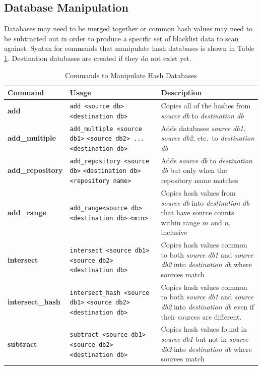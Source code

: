 \documentclass[11pt,fleqn]{article} %
\begin{document}
\subsection{Database Manipulation}
\label{DatabaseManipulation}
Databases may need to be merged together or common hash values may need to be subtracted out in order to produce a specific set of blacklist data to scan against.
Syntax for commands that manipulate hash databases is shown in Table \ref{tab:databaseManipulation}.
Destination databases are created if they do not exist yet.
\begin{table}[!ht]
\centering
\caption{Commands to Manipulate Hash Databases}
\label{tab:databaseManipulation}
\begin{tabular}{|p{3.5 cm}|p{6 cm}|p{4 cm}|}
\hline \hline
\textbf{Command} & \textbf{Usage} & \textbf{Description} \\
\hline
\textbf{add} & \verb+add <source db>+ \verb+<destination db>+ & Copies all of the hashes from \textit{source db} to \textit{destination db}\\
\hline
\textbf{add\_multiple} &  \verb+add_multiple <source db1>+ \verb+<source db2> ...+ \verb+<destination db>+ & Adds databases \textit{source db1}, \textit{source db2}, etc.\ to \textit{destination db}\\
\hline
\textbf{add\_repository} & \verb+add_repository <source db>+ \verb+<destination db>+ \verb+<repository name>+ & Adds \textit{source db} to \textit{destination db} but only when the repository name matches\\
\hline
\textbf{add\_range} & \verb+add_range<source db>+ \verb+<destination db>+ \verb+<m:n>+&   Copies hash values from \textit{source db} into \textit{destination db} that have source counts within range $m$ and $n$, inclusive\\
\hline
\textbf{intersect} & \verb+intersect <source db1>+ \verb+<source db2> <destination db>+ &   Copies hash values common to both \textit{source db1} and \textit{source db2} into \textit{destination db} where sources match\\
\hline
\textbf{intersect\_hash} & \verb+intersect_hash <source db1>+ \verb+<source db2> <destination db>+ &   Copies hash values common to both \textit{source db1} and \textit{source db2} into \textit{destination db} even if their sources are different.\\
\hline
\textbf{subtract} & \verb+subtract <source db1>+ \verb+<source db2> <destination db>+&   Copies hash values found in \textit{source db1} but not in \textit{source db2} into \textit{destination db} where sources match\\

\end{tabular}
\end{table}
\end{document}
